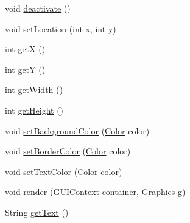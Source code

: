 \begin{DoxyCompactItemize}
\item 
void \mbox{\hyperlink{classorg_1_1newdawn_1_1slick_1_1gui_1_1_text_field_acaa6aaef24d8559cf96309fe7e53e3fe}{deactivate}} ()
\item 
void \mbox{\hyperlink{classorg_1_1newdawn_1_1slick_1_1gui_1_1_text_field_a229334a6273b95ffb76feb05fa994e96}{set\+Location}} (int \mbox{\hyperlink{classorg_1_1newdawn_1_1slick_1_1gui_1_1_text_field_a05dd91af6b1552f194c1aadbdf894c8c}{x}}, int \mbox{\hyperlink{classorg_1_1newdawn_1_1slick_1_1gui_1_1_text_field_acb0df9f048eabd20f6d5d40799b48706}{y}})
\item 
int \mbox{\hyperlink{classorg_1_1newdawn_1_1slick_1_1gui_1_1_text_field_a42552f68cb0c015f2d127fd190a0afce}{getX}} ()
\item 
int \mbox{\hyperlink{classorg_1_1newdawn_1_1slick_1_1gui_1_1_text_field_ab9ad1b3f4528289832bca8b3a27c0f60}{getY}} ()
\item 
int \mbox{\hyperlink{classorg_1_1newdawn_1_1slick_1_1gui_1_1_text_field_a2080debdd772603b3165cda49864255d}{get\+Width}} ()
\item 
int \mbox{\hyperlink{classorg_1_1newdawn_1_1slick_1_1gui_1_1_text_field_a85f5ce83b3a401fe694cf8027a15f222}{get\+Height}} ()
\item 
void \mbox{\hyperlink{classorg_1_1newdawn_1_1slick_1_1gui_1_1_text_field_adcd0242636807d6e4223b3c5238ec354}{set\+Background\+Color}} (\mbox{\hyperlink{classorg_1_1newdawn_1_1slick_1_1_color}{Color}} color)
\item 
void \mbox{\hyperlink{classorg_1_1newdawn_1_1slick_1_1gui_1_1_text_field_a9d31f9fb3f17624289cb95289592518a}{set\+Border\+Color}} (\mbox{\hyperlink{classorg_1_1newdawn_1_1slick_1_1_color}{Color}} color)
\item 
void \mbox{\hyperlink{classorg_1_1newdawn_1_1slick_1_1gui_1_1_text_field_aa1b3af85680ef374170b1b458d549439}{set\+Text\+Color}} (\mbox{\hyperlink{classorg_1_1newdawn_1_1slick_1_1_color}{Color}} color)
\item 
void \mbox{\hyperlink{classorg_1_1newdawn_1_1slick_1_1gui_1_1_text_field_ab0ccda30370e0b9b27cf398c38fc5b83}{render}} (\mbox{\hyperlink{interfaceorg_1_1newdawn_1_1slick_1_1gui_1_1_g_u_i_context}{G\+U\+I\+Context}} \mbox{\hyperlink{classorg_1_1newdawn_1_1slick_1_1gui_1_1_abstract_component_af6d1abaa24da0b9a06fb153722e15435}{container}}, \mbox{\hyperlink{classorg_1_1newdawn_1_1slick_1_1_graphics}{Graphics}} g)
\item 
String \mbox{\hyperlink{classorg_1_1newdawn_1_1slick_1_1gui_1_1_text_field_a81258ba3259b7edb6cdbca7727909305}{get\+Text}} ()

\end{DoxyCompactItemize}
